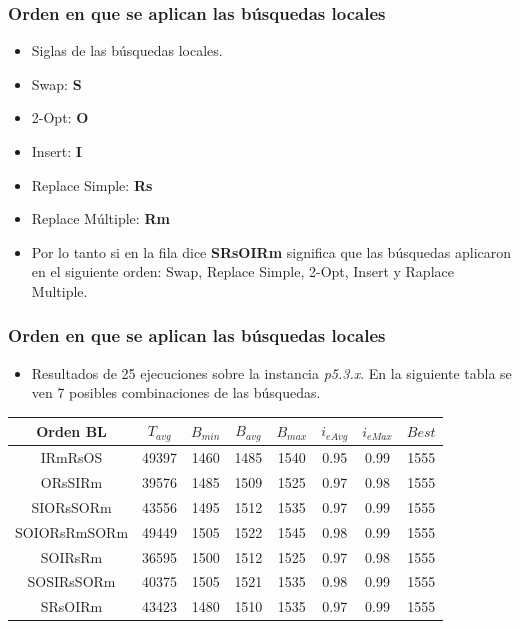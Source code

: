 \documentclass{beamer}
\begin{document}

\begin{frame}
\frametitle{Orden en que se aplican las búsquedas locales}

\begin{itemize}
    \item Siglas de las búsquedas locales.
    \pause
    \item Swap: \textbf{S}
    \pause
    \item 2-Opt: \textbf{O}
    \pause
    \item Insert: \textbf{I}
    \pause
    \item Replace Simple: \textbf{Rs}
    \pause
    \item Replace Múltiple: \textbf{Rm}
    \pause
    \item Por lo tanto si en la fila dice \textbf{SRsOIRm} significa que las búsquedas aplicaron en el siguiente orden: Swap, Replace Simple, 2-Opt, Insert y Raplace Multiple.    
\end{itemize}

\end{frame}


\begin{frame}
\frametitle{Orden en que se aplican las búsquedas locales}

\begin{itemize}
    \item Resultados de 25 ejecuciones sobre la instancia \textit{p5.3.x}. En la siguiente tabla se ven 7 posibles combinaciones de las búsquedas.
\end{itemize}

\begin{table}
\begin{center}
\begin{tabular}{ |c|c|c|c|c|c|c|c| } 
\hline
Orden BL & $T_{avg}$ & $B_{min}$ & $B_{avg}$ & $B_{max}$ & $i_{eAvg}$ & $i_{eMax}$ & $Best$ \\
\hline
IRmRsOS & 49397 & 1460 & 1485 & 1540 & 0.95 & 0.99 & 1555  \\
ORsSIRm & 39576 & 1485 & 1509 & 1525 & 0.97 & 0.98 & 1555  \\
SIORsSORm & 43556 & 1495 & 1512 & 1535 & 0.97 & 0.99 & 1555  \\
SOIORsRmSORm & 49449 & 1505 & 1522 & 1545 & 0.98 & 0.99 & 1555  \\
SOIRsRm & 36595 & 1500 & 1512 & 1525 & 0.97 & 0.98 & 1555  \\
SOSIRsSORm & 40375 & 1505 & 1521 & 1535 & 0.98 & 0.99 & 1555  \\
SRsOIRm & 43423 & 1480 & 1510 & 1535 & 0.97 & 0.99 & 1555  \\
\hline
\end{tabular}
\end{center}
\label{tab:resultadosListaLS1}
\end{table}

\end{frame}
\end{document}
